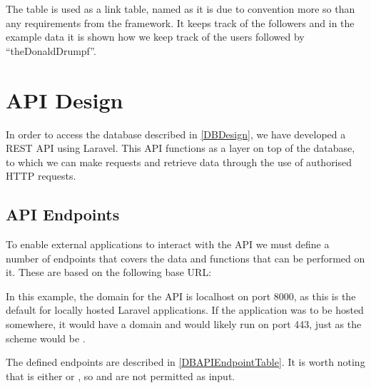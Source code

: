 The table  is used as a link table, named as it is due
to convention more so than any requirements from the framework. It keeps track
of the followers and in the example data it is shown how we keep track of the
users followed by ``theDonaldDrumpf''.

\section{\acs{API} Design}
In order to access the database described in \autoref{DBDesign}, we have
developed a \ac{REST} \ac{API} using Laravel. This
\ac{API} functions as a layer on top of the database, to which we can make
requests and retrieve data through the use of authorised \ac{HTTP} requests.

\subsection{\acs{API} Endpoints}
To enable external applications to interact with the \ac{API} we must
define a number of endpoints that covers the data and functions that can be
performed on it. These are based on the following base \ac{URL}:\nl

\nl

In this example, the domain for the \ac{API} is localhost on port 8000, as this is
the default for locally hosted Laravel applications. If the application was to
be hosted somewhere, it would have a domain and would likely run on port 443,
just as the scheme would be .\nl

The defined endpoints are described in \autoref{DBAPIEndpointTable}. It is worth
noting that  is either  or , so  and
 are not permitted as input. 

